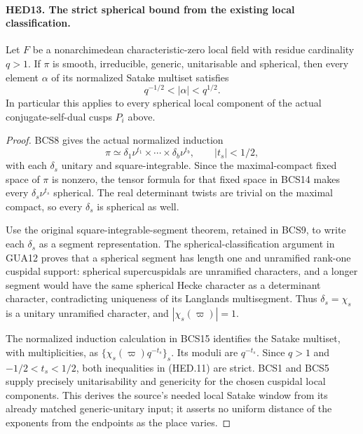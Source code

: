 \paragraph{HED13. The strict spherical bound from the existing local classification.}
\label{claim:HED13}
Let \(F\) be a nonarchimedean characteristic-zero local field with
residue cardinality \(q>1\).  If \(\pi\) is smooth, irreducible,
generic, unitarisable and spherical, then every element \(\alpha\)
of its normalized Satake multiset satisfies
\[
                         q^{-1/2}<|\alpha|<q^{1/2}.
 \tag{HED.11}
\]
In particular this applies to every spherical local component of
the actual conjugate-self-dual cusps \(P_i\) above.
\begin{proof}
BCS8 gives the actual normalized induction
\[
          \pi\simeq\delta_1\nu^{t_1}\times\cdots\times
                             \delta_b\nu^{t_b},\qquad |t_s|<1/2,
\]
with each \(\delta_s\) unitary and square-integrable.  Since the
maximal-compact fixed space of \(\pi\) is nonzero, the tensor
formula for that fixed space in BCS14 makes every
\(\delta_s\nu^{t_s}\) spherical.  The real determinant twists
are trivial on the maximal compact, so every \(\delta_s\) is
spherical as well.

Use the original square-integrable-segment theorem, retained in
BCS9, to write each \(\delta_s\) as a segment representation.
The spherical-classification argument in GUA12 proves that a
spherical segment has length one and unramified rank-one cuspidal
support: spherical supercuspidals are unramified characters, and
a longer segment would have the same spherical Hecke character
as a determinant character, contradicting uniqueness of its
Langlands multisegment.  Thus \(\delta_s=\chi_s\) is a unitary
unramified character, and \(|\chi_s(\varpi)|=1\).

The normalized induction calculation in BCS15 identifies the
Satake multiset, with multiplicities, as
\(\{\chi_s(\varpi)q^{-t_s}\}_s\).  Its moduli are \(q^{-t_s}\).
Since \(q>1\) and \(-1/2<t_s<1/2\), both inequalities in
(HED.11) are strict.  BCS1 and BCS5 supply precisely unitarisability
and genericity for the chosen cuspidal local components.
This derives the source's needed local Satake window from its
already matched generic-unitary input; it asserts no uniform
distance of the exponents from the endpoints as the place varies.
\end{proof}

